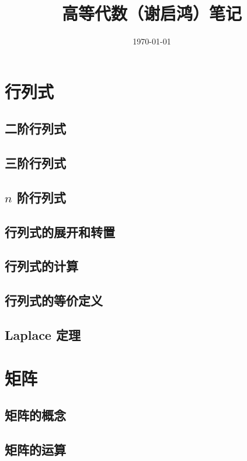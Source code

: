 \documentclass[UTF8,12pt,a4paper,fontset=fandol]{ctexbook}
\title{高等代数（谢启鸿）笔记}
\author{}
\date{\today}
\begin{document}
\maketitle
\tableofcontents
\clearpage


\chapter{行列式}

\section{二阶行列式}

\section{三阶行列式}

\section{\texorpdfstring{$n$}{n} 阶行列式}

\section{行列式的展开和转置}

\section{行列式的计算}

\section{行列式的等价定义}

\section{Laplace 定理}


\chapter{矩阵}

\section{矩阵的概念}

\section{矩阵的运算}
\end{document}
